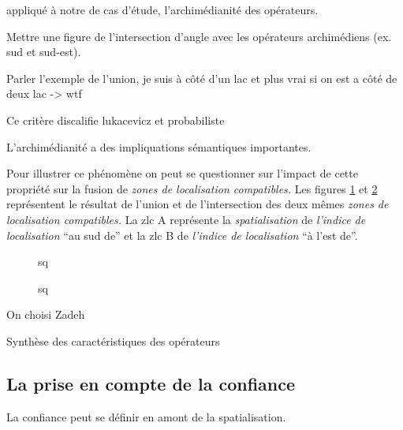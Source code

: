 appliqué à notre de cas d'étude, l'archimédianité des opérateurs.

Mettre une figure de l'intersection d'angle avec les opérateurs
archimédiens (ex. sud et sud-est).

Parler l'exemple de l'union, je suis à côté d'un lac et plus vrai si
on est a côté de deux lac -> wtf

Ce critère discalifie lukacevicz et probabiliste

L'archimédianité a des impliquations sémantiques importantes.

Pour illustrer ce phénomène on peut se questionner sur l'impact de
cette propriété sur la fusion de \emph{zones de localisation
  compatibles.}  Les figures \ref{fig:comparaison_operateurs_union} et
\ref{fig:comparaison_operateurs_intersection} représentent le résultat
de l'union et de l'intersection des deux mêmes \emph{zones de
  localisation compatibles.} La \ac{zlc}
\textcolor{RdBu-9-1}{\textsf{A}} représente la \emph{spatialisation}
de \emph{l'indice de localisation} \enquote{au sud de} et la \ac{zlc}
\textcolor{RdBu-9-9}{\textsf{B}} de \emph{l'indice de localisation}
\enquote{à l'est de}.

\begin{figure}
  \centering
  
  \caption{sq}
  \label{fig:comparaison_operateurs_union}
\end{figure}

\begin{figure}
  \centering
  
  \caption{sq}
  \label{fig:comparaison_operateurs_intersection}
\end{figure}



On choisi Zadeh

\begin{table}
  \centering
  
  \caption{Synthèse des caractéristiques des opérateurs}
\end{table}



\subsection{La prise en compte de la confiance}

La confiance peut se définir en amont de la spatialisation.

